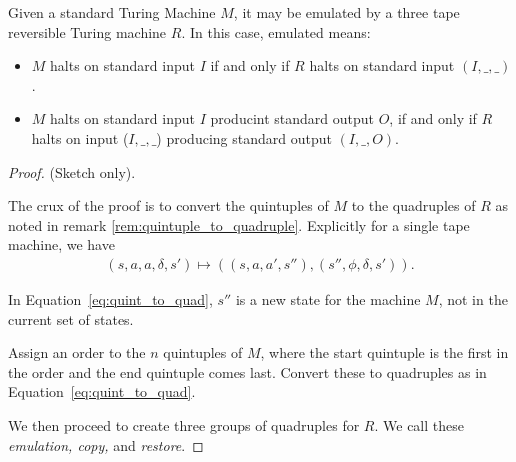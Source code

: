 \begin{theorem}\label{thm:reversible_turing_machine_emulates_standard}
  Given a standard Turing Machine $M$, it may be emulated by a three tape reversible
  Turing machine $R$. In this case, emulated means:
  \begin{itemize}
    \item $M$ halts on standard input $I$ if and only if $R$ halts on standard input $(I,\_,\_)$.
    \item $M$ halts on standard input $I$ producint standard output $O$,
      if and only if $R$ halts on input ($I,\_,\_$) producing standard output $(I,\_,O)$.
  \end{itemize}
\end{theorem}
\begin{proof}
  (Sketch only).

  The crux of the proof is to convert the quintuples of $M$ to the quadruples of
  $R$ as noted in remark \vref{rem:quintuple_to_quadruple}. Explicitly for a single
	tape machine, we have
  \begin{align}
    (s,a,a,\delta,s') \mapsto \left((s,a,a',s''),
          (s'',\phi,\delta,s')\right).\label{eq:quint_to_quad}
  \end{align}
	
	In Equation~\eqref{eq:quint_to_quad}, $s''$ is a new state for the machine $M$, 
	not in the current set of states.

  Assign an order to the $n$ quintuples of $M$, where the start
  quintuple is the first in the order and the end quintuple comes last. Convert these to
	quadruples as in Equation~\eqref{eq:quint_to_quad}. 
	
	We then proceed to create three groups of quadruples for $R$.
  We call these \emph{emulation, copy,} and \emph{restore}.


\end{proof}
